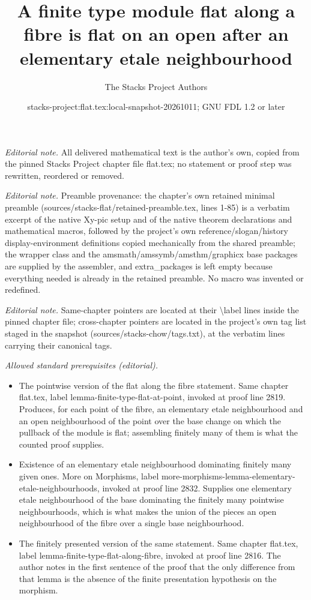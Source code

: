 \documentclass[10pt,a4paper]{amsart}
\title{A finite type module flat along a fibre is flat on an open after an elementary etale neighbourhood}
\author{The Stacks Project Authors}
\date{stacks-project:flat.tex:local-snapshot-20261011; GNU FDL 1.2 or later}
\theoremstyle{plain}
\theoremstyle{definition}
\theoremstyle{remark}
\numberwithin{equation}{subsection}
\begin{document}
\maketitle
\noindent\textit{Editorial note.} All delivered mathematical text is the author's own, copied from the pinned Stacks Project chapter file flat.tex; no statement or proof step was rewritten, reordered or removed.\par\medskip
\noindent\textit{Editorial note.} Preamble provenance: the chapter's own retained minimal preamble (sources/stacks-flat/retained-preamble.tex, lines 1-85) is a verbatim excerpt of the native Xy-pic setup and of the native theorem declarations and mathematical macros, followed by the project's own reference/slogan/history display-environment definitions copied mechanically from the shared preamble; the wrapper class and the amsmath/amssymb/amsthm/graphicx base packages are supplied by the assembler, and extra\_packages is left empty because everything needed is already in the retained preamble. No macro was invented or redefined.\par\medskip
\noindent\textit{Editorial note.} Same-chapter pointers are located at their \textbackslash{}label lines inside the pinned chapter file; cross-chapter pointers are located in the project's own tag list staged in the snapshot (sources/stacks-chow/tags.txt), at the verbatim lines carrying their canonical tags.\par\medskip
\noindent\textit{Allowed standard prerequisites (editorial).}\begin{itemize}
\item The pointwise version of the flat along the fibre statement. Same chapter flat.tex, label lemma-finite-type-flat-at-point, invoked at proof line 2819. Produces, for each point of the fibre, an elementary etale neighbourhood and an open neighbourhood of the point over the base change on which the pullback of the module is flat; assembling finitely many of them is what the counted proof supplies.
\item Existence of an elementary etale neighbourhood dominating finitely many given ones. More on Morphisms, label more-morphisms-lemma-elementary-etale-neighbourhoods, invoked at proof line 2832. Supplies one elementary etale neighbourhood of the base dominating the finitely many pointwise neighbourhoods, which is what makes the union of the pieces an open neighbourhood of the fibre over a single base neighbourhood.
\item The finitely presented version of the same statement. Same chapter flat.tex, label lemma-finite-type-flat-along-fibre, invoked at proof line 2816. The author notes in the first sentence of the proof that the only difference from that lemma is the absence of the finite presentation hypothesis on the morphism.
\end{itemize}\medskip
\end{document}
